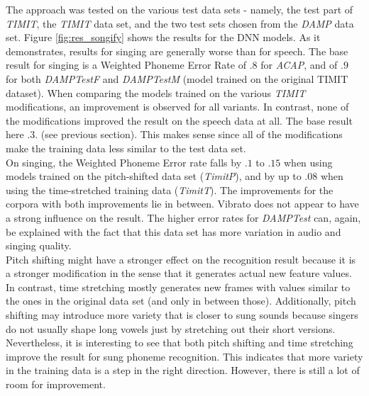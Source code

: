 The approach was tested on the various test data sets - namely, the test part of \textit{TIMIT}, the \textit{TIMIT} data set, and the two test sets chosen from the \textit{DAMP} data set. Figure \ref{fig:res_songify} shows the results for the DNN models. As it demonstrates, results for singing are generally worse than for speech. The base result for singing is a Weighted Phoneme Error Rate of $.8$ for \textit{ACAP}, and of $.9$ for both \textit{DAMPTestF} and \textit{DAMPTestM} (model trained on the original TIMIT dataset). When comparing the models trained on the various \textit{TIMIT} modifications, an improvement is observed for all variants. In contrast, none of the modifications improved the result on the speech data at all. The base result here $.3$. (see previous section). This makes sense since all of the modifications make the training data less similar to the test data set.\\
On singing, the Weighted Phoneme Error rate falls by $.1$ to $.15$ when using models trained on the pitch-shifted data set (\textit{TimitP}), and by up to $.08$ when using the time-stretched training data (\textit{TimitT}). The improvements for the corpora with both improvements lie in between. Vibrato does not appear to have a strong influence on the result. The higher error rates for \textit{DAMPTest} can, again, be explained with the fact that this data set has more variation in audio and singing quality.\\
Pitch shifting might have a stronger effect on the recognition result because it is a stronger modification in the sense that it generates actual new feature values. In contrast, time stretching mostly generates new frames with values similar to the ones in the original data set (and only in between those). Additionally, pitch shifting may introduce more variety that is closer to sung sounds because singers do not usually shape long vowels just by stretching out their short versions.\\
Nevertheless, it is interesting to see that both pitch shifting and time stretching improve the result for sung phoneme recognition. This indicates that more variety in the training data is a step in the right direction. However, there is still a lot of room for improvement.





